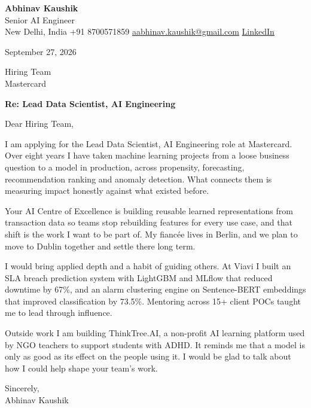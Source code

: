 \documentclass[11pt,a4paper]{article}
\begin{document}
{\Large\bfseries Abhinav Kaushik}\\
Senior AI Engineer\\
New Delhi, India \textbar{} +91 8700571859 \textbar{} \href{mailto:aabhinav.kaushik@gmail.com}{aabhinav.kaushik@gmail.com} \textbar{} \href{https://www.linkedin.com/in/abhinav-kaushik10/}{LinkedIn}  

September 27, 2026

Hiring Team\\
Mastercard

\textbf{Re: Lead Data Scientist, AI Engineering}

Dear Hiring Team,

I am applying for the Lead Data Scientist, AI Engineering role at Mastercard. Over eight years I have taken machine learning projects from a loose business question to a model in production, across propensity, forecasting, recommendation ranking and anomaly detection. What connects them is measuring impact honestly against what existed before.

Your AI Centre of Excellence is building reusable learned representations from transaction data so teams stop rebuilding features for every use case, and that shift is the work I want to be part of. My fiancée lives in Berlin, and we plan to move to Dublin together and settle there long term.

I would bring applied depth and a habit of guiding others. At Viavi I built an SLA breach prediction system with LightGBM and MLflow that reduced downtime by 67\%, and an alarm clustering engine on Sentence-BERT embeddings that improved classification by 73.5\%. Mentoring across 15+ client POCs taught me to lead through influence.

Outside work I am building ThinkTree.AI, a non-profit AI learning platform used by NGO teachers to support students with ADHD. It reminds me that a model is only as good as its effect on the people using it. I would be glad to talk about how I could help shape your team's work.

Sincerely,\\[4pt]
Abhinav Kaushik
\end{document}
